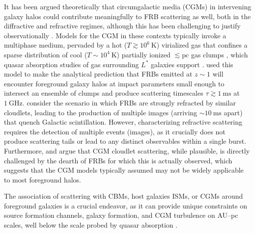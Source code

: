 \documentclass[twocolumn, linenumbers, tra]{aastex631}
\begin{document}
It has been argued theoretically that circumgalactic media (CGMs) in intervening galaxy halos could contribute meaningfully to FRB scattering as well, both in the diffractive \citep{vedantham2019} and refractive \citep{Jow2024} regimes, although this has been challenging to justify observationally \citep{Connor2020, Chawla2022, Prochaska2019b}. Models for the CGM in these contexts typically invoke a multiphase medium, pervaded by a hot ($T \gtrsim 10^{6}\ \mathrm{K}$) virialized gas \citep{Dai2010} that confines a sparse distribution of cool ($T \sim 10^{4}\ \mathrm{K}$) partially ionized $\lesssim \mathrm{pc}$ gas clumps \citep[sometimes described as cloudlets that form a larger ``mist'';][]{McCourt2018}, which quasar absorption studies of gas surrounding $L^{*}$ galaxies support \citep{Stocke2013, Werk2014}. \citet{vedantham2019} used this model to make the analytical prediction that FRBs emitted at $z \sim 1$ will encounter foreground galaxy halos at impact parameters small enough to intersect an ensemble of clumps and produce scattering timescales $\tau \gtrsim 1\ \mathrm{ms}$ at $1\ \mathrm{GHz}$. \citet{Jow2024} consider the scenario in which FRBs are strongly refracted by similar cloudlets, leading to the production of multiple images (arriving $ \sim 10\ \mathrm{ms}$ apart) that quench Galactic scintillation. However, characterizing refractive scattering requires the detection of multiple events (images), as it crucially does not produce scattering tails or lead to any distinct observables within a single burst. Furthermore, \citet{Ocker2021} and \citet{Jow2024} argue that CGM cloudlet scattering, while plausible, is directly challenged by the dearth of FRBs for which this is actually observed, which suggests that the CGM models typically assumed may not be widely applicable to most foreground halos.

The association of scattering with CBMs, host galaxies ISMs, or CGMs around foreground galaxies is a crucial endeavor, as it can provide unique constraints on source formation channels, galaxy formation, and CGM turbulence on AU--pc scales, well below the scale probed by quasar absorption \citep{Cordes2016, vedantham2019, Simard2021, Ocker2022b, Jow2024, Ocker2025}.
\end{document}
